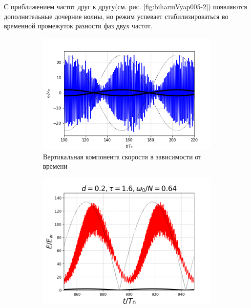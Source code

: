 С приближением частот друг к другу(см. рис. \ref{fig:biharmVyap005-2}) появляются дополнительные дочерние волны, но режим успевает стабилизироваться во временной промежуток разности фаз двух частот. 

\begin{figure}
  \centering
  \begin{subfigure}[с]{0.45\textwidth}
    \includegraphics[width=1\textwidth]{pics/H40L60N1ap05dp20w1p63Deltawp02Biharm/vyX35p57Y11p27t4400.png}
    \caption{Вертикальная компонента скорости в зависимости от времени}
  \end{subfigure}
  \begin{subfigure}[с]{0.45\textwidth}
    \includegraphics[width=1\textwidth]{pics/H40L60N1ap05dp20w1p63Deltawp02Biharm/2D36x36DiagramH40L60N1ap05dp20w1p63Deltawp02BiharmtotKEnonDim.png}

\end{subfigure}
\end{figure}
